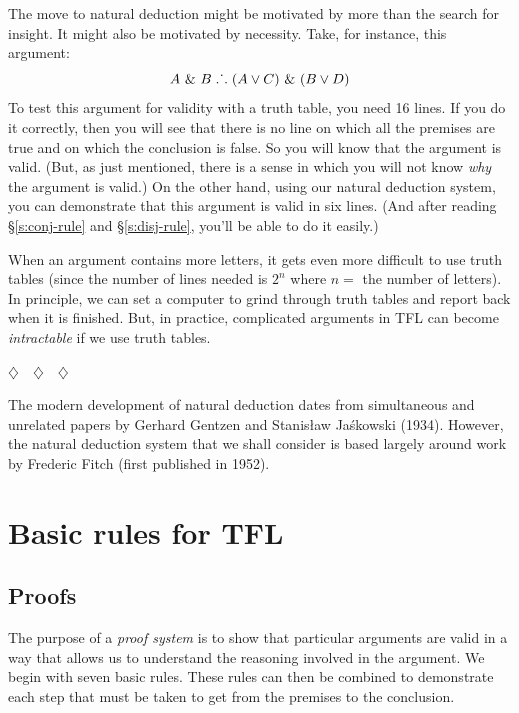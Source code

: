 The move to natural deduction might be motivated by more than the search for insight. It might also be motivated by necessity. Take, for instance, this argument:
$$A ~\&~ B \mathrel{\ldotp\dot{}\,\ldotp} (A \vee C) ~\&~ (B \vee D)$$
To test this argument for validity with a truth table, you need 16 lines. If you do it correctly, then you will see that there is no line on which all the premises are true and on which the conclusion is false. So you will know that the argument is valid. (But, as just mentioned, there is a sense in which you will not know \emph{why} the argument is valid.) On the other hand, using our natural deduction system, you can demonstrate that this argument is valid in six lines. (And after reading \S\ref{s:conj-rule} and \S\ref{s:disj-rule}, you'll be able to do it easily.) 

When an argument contains more letters, it gets even more difficult to use truth tables (since the number of lines needed is $2^{n}$ where $n=$ the number of letters). In principle, we can set a computer to grind through truth tables and report back when it is finished. But, in practice, complicated arguments in TFL can become \emph{intractable} if we use truth tables. %

\begin{center}
	$\diamondsuit\quad\diamondsuit\quad\diamondsuit$
\end{center}

\noindent The modern development of natural deduction dates from simultaneous and unrelated papers by Gerhard Gentzen and Stanisław Jaśkowski (1934). However, the natural deduction system that we shall consider is based largely around work by Frederic Fitch (first published in 1952).



\chapter{Basic rules for TFL}\label{s:BasicTFL}

\section{Proofs}
The purpose of a \emph{proof system} is to show that particular arguments are valid in a way that allows us to understand the reasoning involved in the argument. We begin with seven basic rules. These rules can then be combined to demonstrate each step that must be taken to get from the premises to the conclusion. 


